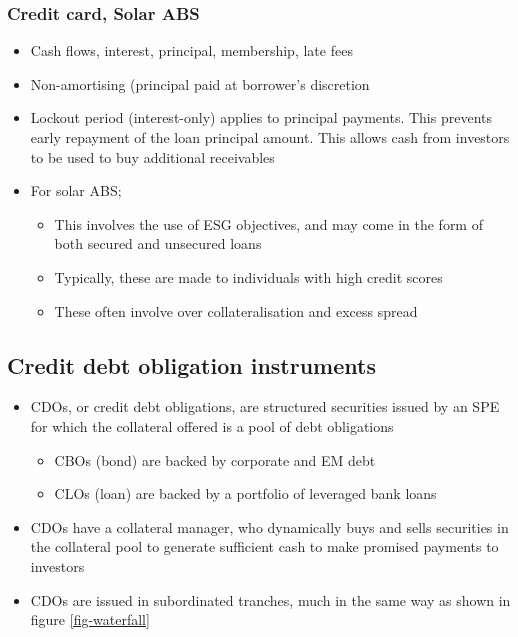 \documentclass[../notes_compiled.tex]{subfiles}
\begin{document}
\subsubsection*{Credit card, Solar ABS}
\begin{itemize}
\item Cash flows, interest, principal, membership, late fees
\item Non-amortising (principal paid at borrower’s discretion
\item Lockout period (interest-only) applies to principal payments. This prevents early repayment of the loan principal amount. This allows cash from investors to be used to buy additional receivables
\item For solar ABS;
\begin{itemize}
\item This involves the use of ESG objectives, and may come in the form of both secured and unsecured loans
\item Typically, these are made to individuals with high credit scores
\item These often involve over collateralisation and excess spread
\end{itemize}
\end{itemize}


\subsection{Credit debt obligation instruments}
\begin{itemize}
\item CDOs, or credit debt obligations, are structured securities issued by an SPE for which the collateral offered is a pool of debt obligations
\begin{itemize}
\item CBOs (bond) are backed by corporate and EM debt
\item CLOs (loan) are backed by a portfolio of leveraged bank loans
\end{itemize}
\item CDOs have a collateral manager, who dynamically buys and sells securities in the collateral pool to generate sufficient cash to make promised payments to investors
\item CDOs are issued in subordinated tranches, much in the same way as shown in figure \ref{fig-waterfall}
\end{itemize}
\end{document}
